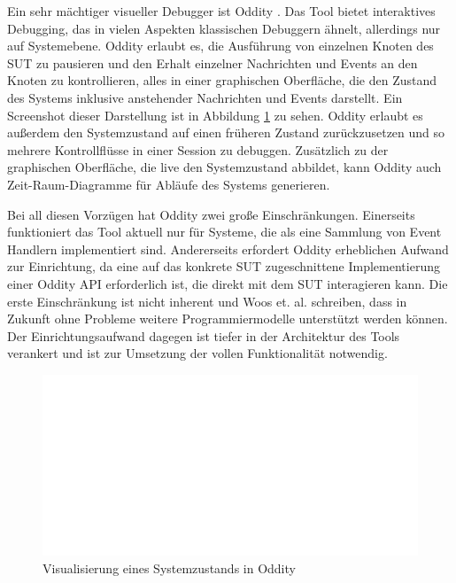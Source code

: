 \documentclass[12pt,a4paper]{report}
\begin{document}
Ein sehr mächtiger visueller Debugger ist Oddity \cite{oddity_graphical_debugger}. Das Tool bietet interaktives Debugging, das in
vielen Aspekten klassischen Debuggern ähnelt, allerdings nur auf Systemebene. Oddity erlaubt es, die Ausführung von einzelnen Knoten
des SUT zu pausieren und den Erhalt einzelner Nachrichten und Events an den Knoten zu kontrollieren, alles in einer graphischen Oberfläche, die den
Zustand des Systems inklusive anstehender Nachrichten und Events darstellt. Ein Screenshot dieser Darstellung ist in Abbildung
\ref{fig:oddity} zu sehen. Oddity erlaubt es außerdem den Systemzustand auf einen früheren Zustand zurückzusetzen und so mehrere
Kontrollflüsse in einer Session zu debuggen. Zusätzlich zu der graphischen Oberfläche, die live den Systemzustand abbildet, kann
Oddity auch Zeit-Raum-Diagramme für Abläufe des Systems generieren.

Bei all diesen Vorzügen hat Oddity zwei große Einschränkungen. Einerseits funktioniert das Tool aktuell nur für Systeme, die als
eine Sammlung von Event Handlern implementiert sind. Andererseits erfordert Oddity erheblichen Aufwand zur Einrichtung, da eine
auf das konkrete SUT zugeschnittene Implementierung einer Oddity API erforderlich ist, die direkt mit dem SUT interagieren kann.
Die erste Einschränkung ist nicht inherent und Woos et. al. \cite{oddity_graphical_debugger} schreiben, dass in Zukunft ohne Probleme weitere
Programmiermodelle unterstützt werden können. Der Einrichtungsaufwand dagegen ist tiefer in der Architektur des Tools verankert und
ist zur Umsetzung der vollen Funktionalität notwendig.

\begin{figure}[H]
	\centering
	\includegraphics[width=\linewidth]{img/oddity_raft_state.pdf}
	\caption{Visualisierung eines Systemzustands in Oddity \cite{oddity_graphical_debugger}}
	\label{fig:oddity}
\end{figure}
\end{document}
